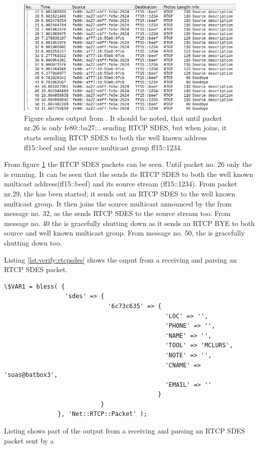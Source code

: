 \begin{figure}[H]
	\centering
	\includegraphics[width=\textwidth]{figures/wireshark_presence}
	\caption{Figure shows output from . It should be noted, that until packet nr.26 is only fe80::ba27:.. sending RTCP SDES, but when \sub{} joins, it starts sending RTCP SDES to both the well known address ff15::beef and the source multicast group ff15::1234.} \label{fig:verify:wireshark_presence}
\end{figure}

From figure \ref{fig:verify:wireshark_presence} the RTCP SDES packets can be seen. Until packet no. 26 only the \pub{} is running. It can be seen that the \pub{} sends its RTCP SDES to both the well known multicast address(ff15::beef) and its source stream (ff15::1234). From packet nr.29, the \sub{} has been started; it sends out an RTCP SDES to the well known multicast group. It then joins the source multicast announced by the \pub{} from message no. 32, as the \sub{} sends RTCP SDES to the source stream too. From message no. 40 the \sub{} is gracefully shutting down as it sends an RTCP BYE to both source and well known multicast group. From message no. 50, the \pub{} is gracefully shutting down too.

Listing \ref{lst:verify:rtcpsdes} shows the ouput from a \sub{} receiving and parsing an RTCP SDES packet.

\begin{listing}[h] 
\begin{verbatim}
\$VAR1 = bless( {
                 'sdes' => {
                             '6c73c635' => {
                                             'LOC' => '',
                                             'PHONE' => '',
                                             'NAME' => '',
                                             'TOOL' => 'MCLURS',
                                             'NOTE' => '',
                                             'CNAME' => 'suas@batbox3',
                                             'EMAIL' => ''
                                           }
                           }
               }, 'Net::RTCP::Packet' );
\end{verbatim}
\caption{Listing shows part of the output from a \sub{} receiving and parsing an RTCP SDES packet sent by a \pub{}}
\label{lst:verify:rtcpsdes}
\end{listing}


